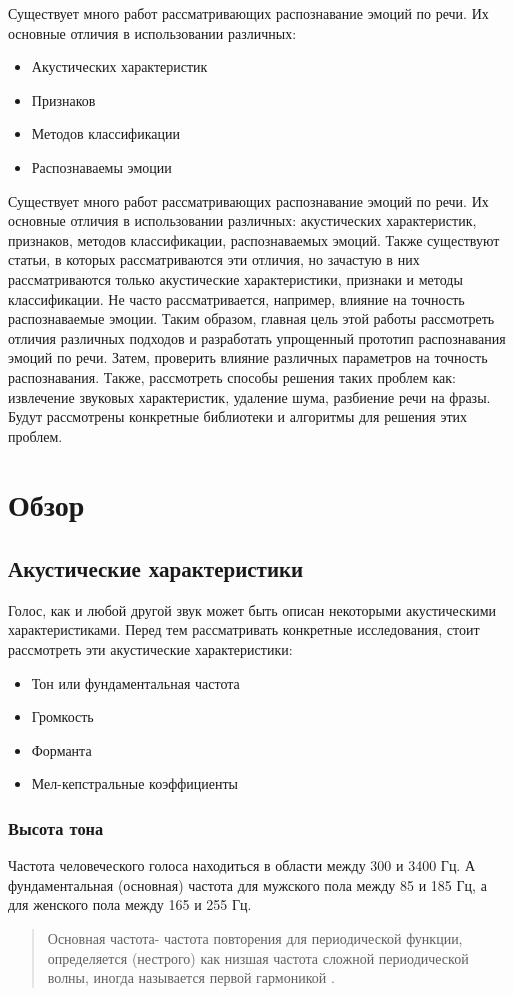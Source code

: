 \documentclass[14pt]{extarticle}
\begin{document}
Существует много работ рассматривающих распознавание эмоций по речи. Их основные отличия в использовании различных:
\begin{itemize}
	\item Акустических характеристик
	\item Признаков
	\item Методов классификации
	\item Распознаваемы эмоции
\end{itemize}

Существует много работ рассматривающих распознавание эмоций по речи. Их основные отличия в использовании различных: акустических характеристик, признаков, методов классификации, распознаваемых эмоций.
Также существуют статьи, в которых рассматриваются эти отличия, но зачастую в них рассматриваются только акустические характеристики, признаки и методы классификации. Не часто рассматривается, например, влияние на точность распознаваемые эмоции.
Таким образом, главная цель этой работы рассмотреть отличия различных подходов и разработать упрощенный прототип распознавания эмоций по речи. Затем, проверить влияние различных параметров на точность распознавания. Также, рассмотреть способы решения таких проблем как: извлечение звуковых характеристик, удаление шума, разбиение речи на фразы. Будут рассмотрены конкретные библиотеки и алгоритмы для решения этих проблем.

\section{Обзор}
\subsection{Акустические характеристики}
Голос, как и любой другой звук может быть описан некоторыми акустическими характеристиками. Перед тем рассматривать конкретные исследования, стоит рассмотреть эти акустические характеристики:
\begin{itemize}
	\item Тон или фундаментальная частота
	\item Громкость
	\item Форманта
	\item Мел-кепстральные коэффициенты
\end{itemize}

\subsubsection{Высота тона}
Частота человеческого голоса находиться в области между 300 и 3400 Гц. А фундаментальная (основная) частота  для мужского пола между 85 и 185 Гц, а для женского пола между 165 и 255 Гц.
\begin{quote}
Основная частота- частота повторения для периодической функции, определяется (нестрого) как низшая частота сложной периодической волны, иногда называется первой гармоникой  \cite{wiki1}.
\end{quote}
\end{document}
